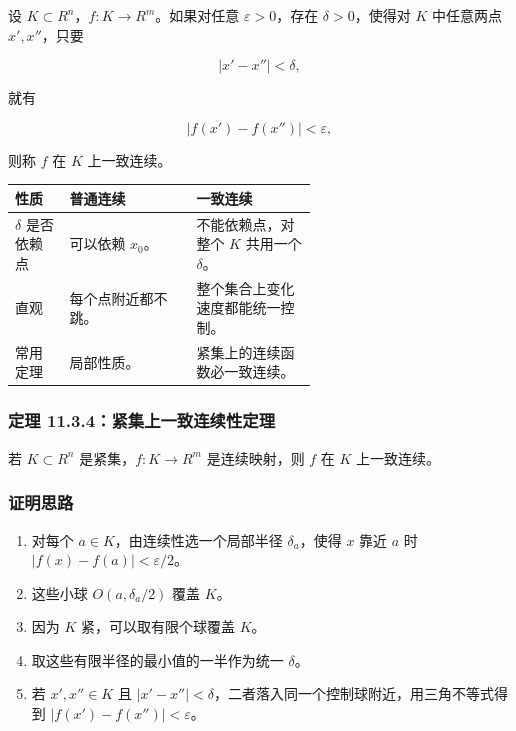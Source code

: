 设 \(K\subset R^n\)，\(f:K\to R^m\)。如果对任意 \(\varepsilon>0\)，存在 \(\delta>0\)，使得对 \(K\) 中任意两点 \(x',x''\)，只要

\[
      |x'-x''|<\delta,
    \]

就有

\[
      |f(x')-f(x'')|<\varepsilon,
    \]

则称 \(f\) 在 \(K\) 上一致连续。

\begin{center}
\small
\begin{tabularx}{\linewidth}{|>{\raggedright\arraybackslash}p{0.18\linewidth}|>{\raggedright\arraybackslash}p{0.42\linewidth}|>{\raggedright\arraybackslash}X|}
\hline
\textbf{性质} & \textbf{普通连续} & \textbf{一致连续} \\ \hline
\(\delta\) 是否依赖点 & 可以依赖 \(x_0\)。 & 不能依赖点，对整个 \(K\) 共用一个 \(\delta\)。 \\ \hline
直观 & 每个点附近都不跳。 & 整个集合上变化速度都能统一控制。 \\ \hline
常用定理 & 局部性质。 & 紧集上的连续函数必一致连续。 \\ \hline
\end{tabularx}
\end{center}

\subsubsection*{定理 11.3.4：紧集上一致连续性定理}

若 \(K\subset R^n\) 是紧集，\(f:K\to R^m\) 是连续映射，则 \(f\) 在 \(K\) 上一致连续。

\subsubsection*{证明思路}

\begin{enumerate}
 \item 对每个 \(a\in K\)，由连续性选一个局部半径 \(\delta_a\)，使得 \(x\) 靠近 \(a\) 时 \(|f(x)-f(a)|<\varepsilon/2\)。
 \item 这些小球 \(O(a,\delta_a/2)\) 覆盖 \(K\)。
 \item 因为 \(K\) 紧，可以取有限个球覆盖 \(K\)。
 \item 取这些有限半径的最小值的一半作为统一 \(\delta\)。
 \item 若 \(x',x''\in K\) 且 \(|x'-x''|<\delta\)，二者落入同一个控制球附近，用三角不等式得到 \(|f(x')-f(x'')|<\varepsilon\)。
 \end{enumerate}

